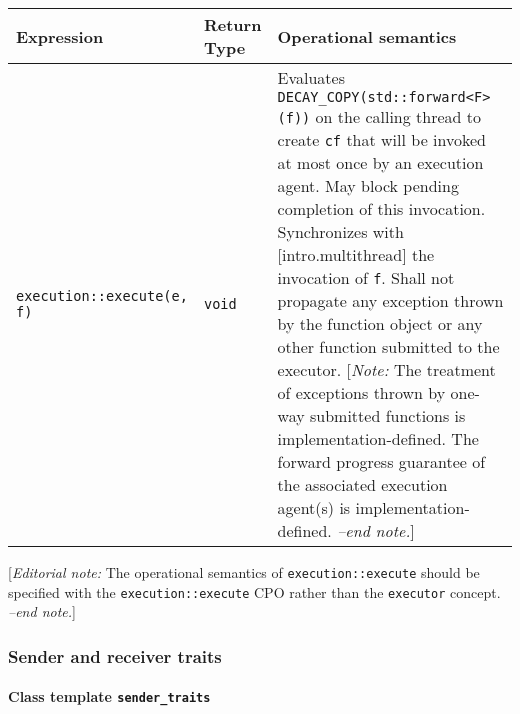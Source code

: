 \documentclass[a4paper,12pt,notitlepage,twoside,openright]{article}
\begin{document}
\begin{longtable}[]{@{}lll@{}}
\toprule
\begin{minipage}[b]{0.23\columnwidth}\raggedright
Expression\strut
\end{minipage} & \begin{minipage}[b]{0.25\columnwidth}\raggedright
Return Type\strut
\end{minipage} & \begin{minipage}[b]{0.43\columnwidth}\raggedright
Operational semantics\strut
\end{minipage}\tabularnewline
\midrule
\endhead
\begin{minipage}[t]{0.23\columnwidth}\raggedright
\texttt{execution::execute(e, f)}\strut
\end{minipage} & \begin{minipage}[t]{0.25\columnwidth}\raggedright
\texttt{void}\strut
\end{minipage} & \begin{minipage}[t]{0.43\columnwidth}\raggedright
Evaluates \texttt{DECAY_COPY(std::forward<F>(f))} on the
calling thread to create \texttt{cf} that will be invoked at
most once by an execution agent. May block pending completion of this
invocation. Synchronizes with {[}intro.multithread{]} the invocation of
\texttt{f}. Shall not propagate any exception thrown by the
function object or any other function submitted to the executor.
{[}\emph{Note:} The treatment of exceptions thrown by one-way submitted
functions is implementation-defined. The forward progress guarantee of
the associated execution agent(s) is implementation-defined. \emph{--end
note.}{]}\strut
\end{minipage}\tabularnewline
\bottomrule
\end{longtable}

{[}\emph{Editorial note:} The operational semantics of
\texttt{execution::execute} should be specified with the
\texttt{execution::execute} CPO rather than the
\texttt{executor} concept. \emph{--end note.}{]}

\hypertarget{sender-and-receiver-traits}{%
\subsubsection{Sender and receiver
traits}\label{sender-and-receiver-traits}}

\hypertarget{class-template-sender_traits}{%
\paragraph{\texorpdfstring{Class template
\texttt{sender_traits}}{Class template }}\label{class-template-sender_traits}}
\end{document}
